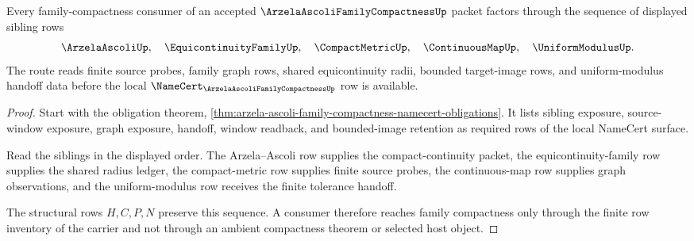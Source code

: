 \begin{theorem}
\label{thm:arzela-ascoli-family-compactness-finite-route}
Every family-compactness consumer of an accepted $\ArzelaAscoliFamilyCompactnessUp$ packet factors through the sequence of displayed sibling rows
$$
\ArzelaAscoliUp,\quad
\EquicontinuityFamilyUp,\quad
\CompactMetricUp,\quad
\ContinuousMapUp,\quad
\UniformModulusUp .
$$
The route reads finite source probes, family graph rows, shared equicontinuity radii, bounded target-image rows, and uniform-modulus handoff data before the local $\NameCert_{\ArzelaAscoliFamilyCompactnessUp}$ row is available.
\end{theorem}
\begin{proof}
Start with the obligation theorem,
\autoref{thm:arzela-ascoli-family-compactness-namecert-obligations}. It lists sibling exposure, source-window exposure, graph exposure, handoff, window readback, and bounded-image retention as required rows of the local NameCert surface.

Read the siblings in the displayed order. The Arzela--Ascoli row supplies the compact-continuity packet, the equicontinuity-family row supplies the shared radius ledger, the compact-metric row supplies finite source probes, the continuous-map row supplies graph observations, and the uniform-modulus row receives the finite tolerance handoff.

The structural rows $H,C,P,N$ preserve this sequence. A consumer therefore reaches family compactness only through the finite row inventory of the carrier and not through an ambient compactness theorem or selected host object.
\end{proof}




